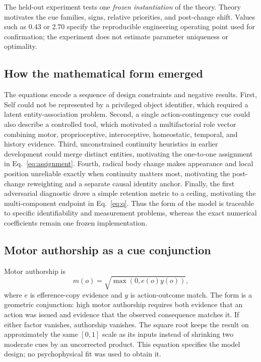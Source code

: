 \documentclass[journal]{IEEEtran}
\begin{document}
The held-out experiment tests one \emph{frozen instantiation} of the theory. Theory motivates the cue families, signs, relative priorities, and post-change shift. Values such as 0.43 or 2.70 specify the reproducible engineering operating point used for confirmation; the experiment does not estimate parameter uniqueness or optimality.

\subsection{How the mathematical form emerged}
The equations encode a sequence of design constraints and negative results. First, Self could not be represented by a privileged object identifier, which required a latent entity-association problem. Second, a single action-contingency cue could also describe a controlled tool, which motivated a multifactorial role vector combining motor, proprioceptive, interoceptive, homeostatic, temporal, and history evidence. Third, unconstrained continuity heuristics in earlier development could merge distinct entities, motivating the one-to-one assignment in Eq.~\eqref{eq:assignment}. Fourth, radical body change makes appearance and local position unreliable exactly when continuity matters most, motivating the post-change reweighting and a separate causal identity anchor. Finally, the first adversarial diagnostic drove a simple retention metric to a ceiling, motivating the multi-component endpoint in Eq.~\eqref{eq:q}. Thus the form of the model is traceable to specific identifiability and measurement problems, whereas the exact numerical coefficients remain one frozen implementation.

\subsection{Motor authorship as a cue conjunction}
Motor authorship is
\begin{equation}
m(o)=\sqrt{\max(0,e(o)y(o))},
\label{eq:motor}
\end{equation}
where $e$ is efference-copy evidence and $y$ is action-outcome match. The form is a geometric conjunction: high motor authorship requires both evidence that an action was issued and evidence that the observed consequence matches it. If either factor vanishes, authorship vanishes. The square root keeps the result on approximately the same $[0,1]$ scale as its inputs instead of shrinking two moderate cues by an uncorrected product. This equation specifies the model design; no psychophysical fit was used to obtain it.
\end{document}

